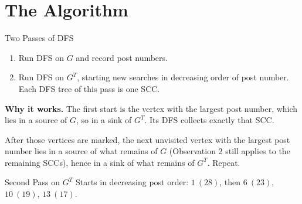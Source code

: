 \documentclass[10pt,aspectratio=169]{beamer}
\newcommand{\sccgraph}[2]{%
  \foreach \i/\x/\y/\g in {1/0/1.3/A, 2/1.2/0.8/A, 3/1.2/-0.8/A, 4/0/-1.3/A,
      5/-1.2/0/A, 6/3.0/1.0/B, 7/5.0/1.5/B, 8/5.0/-1.5/B, 9/3.0/-1.0/B,
      10/7.6/0.7/C, 11/7.6/-0.7/C, 12/10.2/0/D, 13/11.0/0.9/D, 14/11.0/-0.9/D}
    \node[vtx, g\g, v\i/.try] (v\i) at (\x,\y) {\i};
  \foreach \a/\b/\o/\t in {1/2/0/1, 2/3/0/1, 3/4/0/1, 4/2/0/0, 4/5/0/1,
      5/1/0/0, 6/7/0/1, 7/8/0/1, 8/6/0/0, 8/9/0/1, 9/6/0/0, 10/11/25/1,
      11/10/25/0, 12/13/25/0, 13/14/25/1, 14/12/25/1, 5/6/-20/1, 9/10/0/1,
      11/13/-20/1, 2/9/0/0, 7/12/30/0} {
    \ifnum#2=1 \ifnum\t=1 \def\es{tree}\else\def\es{}\fi \else\def\es{}\fi
    \ifnum#1=0
      \draw[dedg, \es] (v\a) to[bend left=\o] (v\b);
    \else
      \draw[dedg] (v\b) to[bend right=\o] (v\a);
    \fi
  }
}
\newcommand{\sccboxes}{%
  \draw[sccbox] (-1.75,-1.85) rectangle (1.75,1.85);
  \draw[sccbox] (2.45,-2.05) rectangle (5.55,2.05);
  \draw[sccbox] (7.0,-1.3) rectangle (8.2,1.3);
  \draw[sccbox] (9.6,-1.5) rectangle (11.6,1.5);
  \node[scclbl] at (0,2.15) {$A$};
  \node[scclbl] at (4.0,2.35) {$B$};
  \node[scclbl] at (7.6,-1.6) {$C$};
  \node[scclbl] at (10.6,1.8) {$D$};
}
\begin{document}
\section{The Algorithm}

\begin{frame}{Two Passes of DFS}
  \begin{enumerate}
    \item Run DFS on $G$ and record post numbers.
    \bigskip
    \item Run DFS on $G^T$, starting new searches in \alert{decreasing} order
          of post number. Each DFS tree of this pass is one SCC.
  \end{enumerate}

  \pause
  \bigskip
  \textbf{Why it works.} The first start is the vertex with the largest post
  number, which lies in a source of $G$, so in a \alert{sink} of $G^T$. Its
  DFS collects exactly that SCC.

  \pause
  \bigskip
  After those vertices are marked, the next unvisited vertex with the largest
  post number lies in a source of what remains of $G$ (Observation 2 still
  applies to the remaining SCCs), hence in a sink of what remains of $G^T$.
  Repeat.
\end{frame}

\begin{frame}{Second Pass on $G^T$}
  Starts in decreasing post order: $1\ (28)$, then $6\ (23)$, $10\ (19)$,
  $13\ (17)$.

  \bigskip
  \begin{center}
  \end{center}

  \begin{center}
    \small
  \end{center}
\end{frame}
\end{document}
